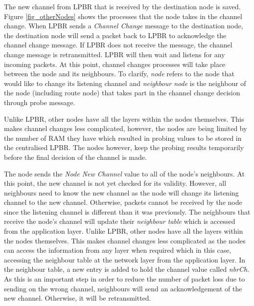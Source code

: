 The new channel from LPBR that is received by the destination node is saved. 
Figure \ref{fig_otherNodes} shows the processes that the node takes in the channel change. When LPBR sends a \textit{Channel Change} message to the destination node, the destination node will send a packet back to LPBR to acknowledge the channel change message. If LPBR does not receive the message, the channel change message is retransmitted. LPBR will then wait and listens for any incoming packets. At this point, channel changes processes will take place between the node and its neighbours. To clarify, \textit{node} refers to the node that would like to change its listening channel and \textit{neighbour node} is the neighbour of the node (including route node) that takes part in the channel change decision through probe message.

Unlike LPBR, other nodes have all the layers within the nodes themselves. This makes channel changes less complicated, however, the nodes are being limited by the number of RAM they have which resulted in probing values to be stored in the centralised LPBR. The nodes however, keep the probing results temporarily before the final decision of the channel is made. 

The node sends the \textit{Node New Channel} value to all of the node's neighbours. At this point, the new channel is not yet checked for its validity. However, all neighbours need to know the new channel as the node will change its listening channel to the new channel. Otherwise, packets cannot be received by the node since the listening channel is different than it was previously. The neighbours that receive the node's channel will update their \textit{neighbour table} which is accessed from the application layer. 
Unlike LPBR, other nodes have all the layers within the nodes themselves. This makes channel changes less complicated as the nodes can access the information from any layer when required which in this case, accessing the neighbour table at the network layer from the application layer.
In the neighbour table, a new entry is added to hold the channel value called \textit{nbrCh}. As this is an important step in order to reduce the number of packet loss due to sending on the wrong channel, neighbours will send an acknowledgement of the new channel. Otherwise, it will be retransmitted. 

